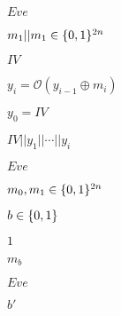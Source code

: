 \documentclass[10pt]{book}
\begin{document}
\begin{mdSnippets}
\begin{mdInlineSnippet}%
$Eve$\end{mdInlineSnippet}%
\begin{mdInlineSnippet}[00f10b2a682a87dbe20dc6782486c4eb]%
$m_1 || m_1 \in \{0,1\}^{2n}$\end{mdInlineSnippet}%
\begin{mdInlineSnippet}[cf482c5807b62034beeabdb795c5a689]%
$IV$\end{mdInlineSnippet}%
\begin{mdInlineSnippet}[693f8b341d773291766d7879d79b5f20]%
$y_i = \mathcal{O}(y_{i-1} \oplus m_i)$\end{mdInlineSnippet}%
\begin{mdInlineSnippet}%
$y_0 = IV$\end{mdInlineSnippet}%
\begin{mdInlineSnippet}%
$IV || y_1 || \cdots || y_i$\end{mdInlineSnippet}%
\begin{mdInlineSnippet}%
$Eve$\end{mdInlineSnippet}%
\begin{mdInlineSnippet}[f4e248732df2408bac52af7446cb02f3]%
$m_0,m_1 \in \{0,1\}^{2n}$\end{mdInlineSnippet}%
\begin{mdInlineSnippet}[6892f7e7c3b8ecc19e4a077e82515567]%
$b \in \{0,1\}$\end{mdInlineSnippet}%
\begin{mdInlineSnippet}[c4ca4238a0b923820dcc509a6f75849b]%
$1$\end{mdInlineSnippet}%
\begin{mdInlineSnippet}[7960e7402c420dc1ba0324867807f1f6]%
$m_b$\end{mdInlineSnippet}%
\begin{mdInlineSnippet}%
$Eve$\end{mdInlineSnippet}%
\begin{mdInlineSnippet}[2765802181072b3aa2be59dae8c72b0d]%
$b'$\end{mdInlineSnippet}%

\end{mdSnippets}
\end{document}

